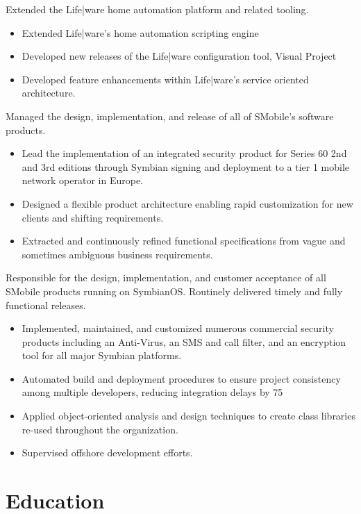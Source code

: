 \documentclass[12pt,letter,sans]{moderncv}
\begin{document}

Extended the Life|ware home automation platform and related tooling.

\begin{itemize}
    \item Extended Life|ware's home automation scripting engine
    \item Developed new releases of the Life|ware configuration tool, Visual Project
    \item Developed feature enhancements within Life|ware's service oriented architecture.
\end{itemize}

 {}{}

Managed the design, implementation, and release of all of SMobile’s software
products.

\begin{itemize}

    \item Lead the implementation of an integrated security product for Series
        60 2nd and 3rd editions through Symbian signing and deployment to a tier
        1 mobile network operator in Europe.

    \item Designed a flexible product architecture enabling rapid customization
        for new clients and shifting requirements.

    \item Extracted and continuously refined functional specifications from vague
        and sometimes ambiguous business requirements.

\end{itemize}


Responsible for the design, implementation, and customer acceptance of all
SMobile products running on SymbianOS.  Routinely delivered timely and fully
functional releases.

\begin{itemize}

    \item Implemented, maintained, and customized numerous commercial security
        products including an Anti-Virus, an SMS and call filter, and an
        encryption tool for all major Symbian platforms.

    \item Automated build and deployment procedures to ensure project
        consistency among multiple developers, reducing integration delays by
        75%

    \item Applied object-oriented analysis and design techniques to create class
        libraries re-used throughout the organization.

    \item Supervised offshore development efforts.

\end{itemize}

\section{Education}

\end{document}

